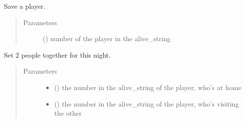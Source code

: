 \documentclass[letterpaper,10pt,english]{sphinxmanual}
\begin{document}
\begin{fulllineitems}

\begin{fulllineitems}
\label{\detokenize{chatwolf:chatwolf.nightactions.Nightactions.save}}
Save a player.
\begin{quote}\begin{description}
\item[{Parameters}] \leavevmode
{} (\sphinxstyleliteralemphasis{\sphinxupquote{{[}}}\sphinxstyleliteralemphasis{\sphinxupquote{{]}}}) \textendash{} number of the player in the alive\_string

\end{description}\end{quote}

\end{fulllineitems}


\begin{fulllineitems}
\label{\detokenize{chatwolf:chatwolf.nightactions.Nightactions.together}}
Set 2 people together for this night.
\begin{quote}\begin{description}
\item[{Parameters}] \leavevmode\begin{itemize}
\item {} 
 () \textendash{} the number in the alive\_string of the player, who’s at home

\item {} 
 () \textendash{} the number in the alive\_string of the player, who’s visiting the other

\end{itemize}

\end{description}\end{quote}

\end{fulllineitems}


\end{fulllineitems}
\end{document}
